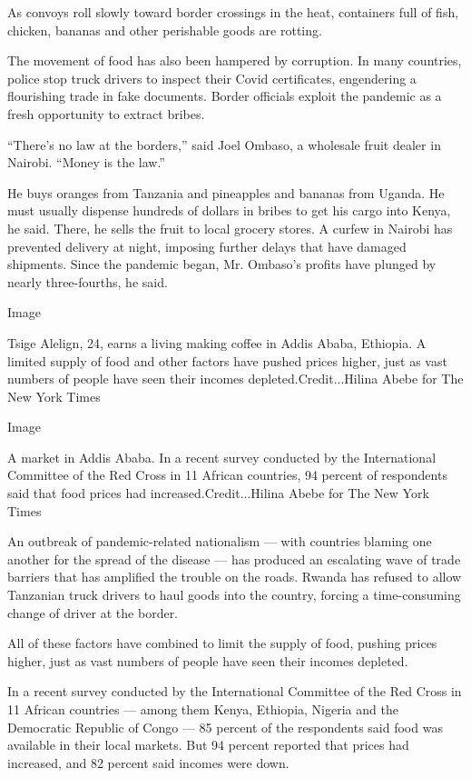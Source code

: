 As convoys roll slowly toward border crossings in the heat, containers
full of fish, chicken, bananas and other perishable goods are rotting.

The movement of food has also been hampered by corruption. In many
countries, police stop truck drivers to inspect their Covid
certificates, engendering a flourishing trade in fake documents. Border
officials exploit the pandemic as a fresh opportunity to extract bribes.

``There's no law at the borders,'' said Joel Ombaso, a wholesale fruit
dealer in Nairobi. ``Money is the law.''

He buys oranges from Tanzania and pineapples and bananas from Uganda. He
must usually dispense hundreds of dollars in bribes to get his cargo
into Kenya, he said. There, he sells the fruit to local grocery stores.
A curfew in Nairobi has prevented delivery at night, imposing further
delays that have damaged shipments. Since the pandemic began, Mr.
Ombaso's profits have plunged by nearly three-fourths, he said.

Image

Tsige Alelign, 24, earns a living making coffee in Addis Ababa,
Ethiopia. A limited supply of food and other factors have pushed prices
higher, just as vast numbers of people have seen their incomes
depleted.Credit...Hilina Abebe for The New York Times

Image

A market in Addis Ababa. In a recent survey conducted by the
International Committee of the Red Cross in 11 African countries, 94
percent of respondents said that food prices had
increased.Credit...Hilina Abebe for The New York Times

An outbreak of pandemic-related nationalism --- with countries blaming
one another for the spread of the disease --- has produced an escalating
wave of trade barriers that has amplified the trouble on the roads.
Rwanda has refused to allow Tanzanian truck drivers to haul goods into
the country, forcing a time-consuming change of driver at the border.

All of these factors have combined to limit the supply of food, pushing
prices higher, just as vast numbers of people have seen their incomes
depleted.

In a recent survey conducted by the International Committee of the Red
Cross in 11 African countries --- among them Kenya, Ethiopia, Nigeria
and the Democratic Republic of Congo --- 85 percent of the respondents
said food was available in their local markets. But 94 percent reported
that prices had increased, and 82 percent said incomes were down.

